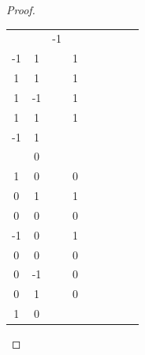 \begin{proof}
\begin{tabular}{c|c|c|c|c|c|c|c|c}
		 &
		\( \begin{matrix}
			   1  & -1 \\
			   -1 & 1
		   \end{matrix}\)
		 &
		\( \begin{matrix}
			   1 & 1 \\
			   1 & 1
		   \end{matrix}\)
		 &
		\( \begin{matrix}
			   1 & 1  \\
			   1 & -1
		   \end{matrix}\)
		 &
		\( \begin{matrix}
			   -1 & 1 \\
			   1  & 1
		   \end{matrix}\)
		 &
		\( \begin{matrix}
			   1  & 1 \\
			   -1 & 1
		   \end{matrix}\) \\
		\hline
		\( \begin{matrix}
			   1 & 0 \\
			   1 & 0
		   \end{matrix}\)
		 &
		\( \begin{matrix}
			   1 & 0 \\
			   0 & 1
		   \end{matrix}\)
		 &
		\( \begin{matrix}
			   1 & 1 \\
			   0 & 0
		   \end{matrix}\)
		 &
		\( \begin{matrix}
			   1  & 0 \\
			   -1 & 0
		   \end{matrix}\)
		 &
		\( \begin{matrix}
			   1 & 1 \\
			   0 & 0
		   \end{matrix}\)
		 &
		\( \begin{matrix}
			   1 & 0  \\
			   0 & -1
		   \end{matrix}\)
		 &
		\( \begin{matrix}
			   1 & 0 \\
			   0 & 1
		   \end{matrix}\)
		 &
		\( \begin{matrix}
			   1 & 0 \\
			   1 & 0
		   \end{matrix}\)
		 &
		\( \begin{matrix}

\end{matrix}
\end{tabular}
\end{proof}
